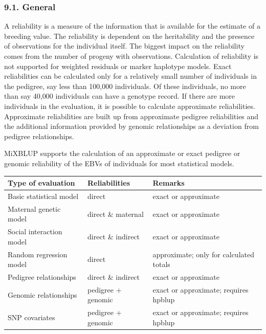 \subsubsection{9.1. General}\label{Reli02}

A reliability is a measure of the information that is available for the
estimate of a breeding value. The reliability is dependent on the
heritability and the presence of observations for the individual itself.
The biggest impact on the reliability comes from the number of progeny
with observations. Calculation of reliability is not supported for
weighted residuals or marker haplotype models. Exact reliabilities can
be calculated only for a relatively small number of individuals in the
pedigree, say less than 100,000 individuals. Of these individuals, no
more than say 40,000 individuals can have a genotype record. If there
are more individuals in the evaluation, it is possible to calculate
approximate reliabilities. Approximate reliabilities are built up from
approximate pedigree reliabilities and the additional information
provided by genomic relationships as a deviation from pedigree
relationships.

MiXBLUP supports the calculation of an approximate or exact pedigree or
genomic reliability of the EBVs of individuals for most statistical
models.

{\def\LTcaptype{none} %
\begin{longtable}[]{@{}
  >{\raggedright\arraybackslash}p{}
  >{\raggedright\arraybackslash}p{}
  >{\raggedright\arraybackslash}p{}@{}}
\toprule\noalign{}
\begin{minipage}[b]{\linewidth}\raggedright
Type of evaluation
\end{minipage} & \begin{minipage}[b]{\linewidth}\raggedright
Reliabilities
\end{minipage} & \begin{minipage}[b]{\linewidth}\raggedright
Remarks
\end{minipage} \\
\midrule\noalign{}
\endhead
\bottomrule\noalign{}
\endlastfoot
Basic statistical model & direct & exact or approximate \\
Maternal genetic model & direct \& maternal & exact or approximate \\
Social interaction model & direct \& indirect & exact or approximate \\
Random regression model & direct & approximate; only for calculated
totals \\
Pedigree relationships & direct \& indirect & exact or approximate \\
Genomic relationships & pedigree + genomic & exact or approximate;
requires hpblup \\
SNP covariates & pedigree + genomic & exact or approximate; requires
hpblup \\
\end{longtable}
}

